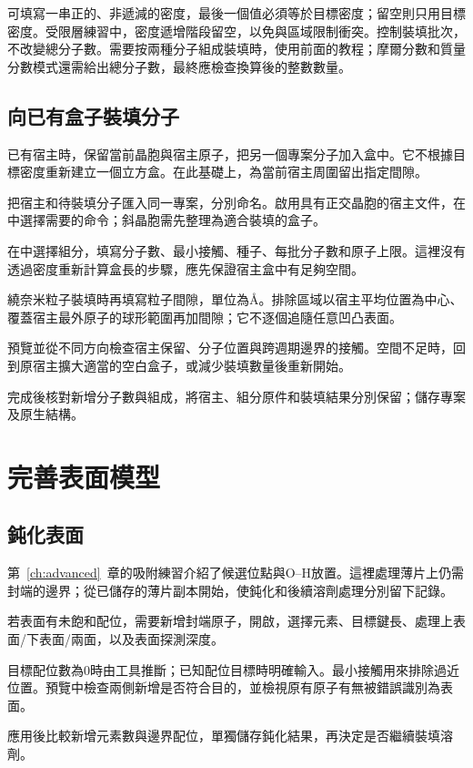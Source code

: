 可填寫一串正的、非遞減的密度，最後一個值必須等於目標密度；留空則只用目標密度。受限層練習中，密度遞增階段留空，以免與區域限制衝突。控制裝填批次，不改變總分子數。需要按兩種分子組成裝填時，使用前面的教程；摩爾分數和質量分數模式還需給出總分子數，最終應檢查換算後的整數數量。

\subsection{向已有盒子裝填分子}\label{sec:host-packing-reference}

已有宿主時，保留當前晶胞與宿主原子，把另一個專案分子加入盒中。它不根據目標密度重新建立一個立方盒。在此基礎上，為當前宿主周圍留出指定間隙。

\begin{steps}
  \item 把宿主和待裝填分子匯入同一專案，分別命名。啟用具有正交晶胞的宿主文件，在中選擇需要的命令；斜晶胞需先整理為適合裝填的盒子。
  \item 在中選擇組分，填寫分子數、最小接觸、種子、每批分子數和原子上限。這裡沒有透過密度重新計算盒長的步驟，應先保證宿主盒中有足夠空間。
  \item 繞奈米粒子裝填時再填寫粒子間隙，單位為\AA。排除區域以宿主平均位置為中心、覆蓋宿主最外原子的球形範圍再加間隙；它不逐個追隨任意凹凸表面。
  \item 預覽並從不同方向檢查宿主保留、分子位置與跨週期邊界的接觸。空間不足時，回到原宿主擴大適當的空白盒子，或減少裝填數量後重新開始。
  \item 完成後核對新增分子數與組成，將宿主、組分原件和裝填結果分別保留；儲存專案及原生結構。
\end{steps}

\section{完善表面模型}

\subsection{鈍化表面}\label{sec:surface-finishing-reference}

第~\ref{ch:advanced}~章的吸附練習介紹了候選位點與O--H放置。這裡處理薄片上仍需封端的邊界；從已儲存的薄片副本開始，使鈍化和後續溶劑處理分別留下記錄。

\begin{steps}
  \item 若表面有未飽和配位，需要新增封端原子，開啟，選擇元素、目標鍵長、處理上表面/下表面/兩面，以及表面探測深度。
  \item 目標配位數為0時由工具推斷；已知配位目標時明確輸入。最小接觸用來排除過近位置。預覽中檢查兩側新增是否符合目的，並檢視原有原子有無被錯誤識別為表面。
  \item 應用後比較新增元素數與邊界配位，單獨儲存鈍化結果，再決定是否繼續裝填溶劑。
\end{steps}

